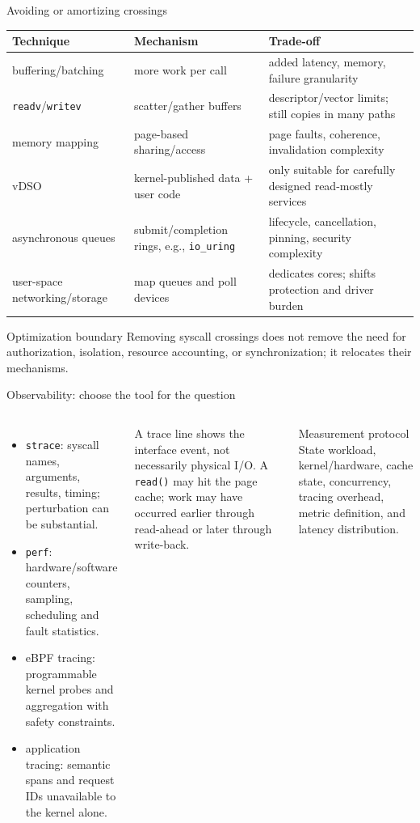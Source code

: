 \documentclass[aspectratio=169,11pt]{beamer}
\newcommand{\code}[1]{\texttt{#1}}
\begin{document}
\begin{frame}{Avoiding or amortizing crossings}
  \scriptsize
  \begin{tabularx}{\textwidth}{@{}lXX@{}}
    \toprule
    \textbf{Technique} & \textbf{Mechanism} & \textbf{Trade-off} \\
    \midrule
    buffering/batching & more work per call & added latency, memory, failure granularity \\
    \code{readv}/\code{writev} & scatter/gather buffers & descriptor/vector limits; still copies in many paths \\
    memory mapping & page-based sharing/access & page faults, coherence, invalidation complexity \\
    vDSO & kernel-published data + user code & only suitable for carefully designed read-mostly services \\
    asynchronous queues & submit/completion rings, e.g., \code{io\_uring} & lifecycle, cancellation, pinning, security complexity \\
    user-space networking/storage & map queues and poll devices & dedicates cores; shifts protection and driver burden \\
    \bottomrule
  \end{tabularx}
  \begin{alertblock}{Optimization boundary}
    Removing syscall crossings does not remove the need for authorization, isolation, resource accounting, or synchronization; it relocates their mechanisms.
  \end{alertblock}
\end{frame}

\begin{frame}{Observability: choose the tool for the question}
  \begin{columns}[T,onlytextwidth]
      \begin{itemize}
        \item \code{strace}: syscall names, arguments, results, timing; perturbation can be substantial.
        \item \code{perf}: hardware/software counters, sampling, scheduling and fault statistics.
        \item eBPF tracing: programmable kernel probes and aggregation with safety constraints.
        \item application tracing: semantic spans and request IDs unavailable to the kernel alone.
      \end{itemize}
      \begin{tcolorbox}[title=Do not infer too much]
        A trace line shows the interface event, not necessarily physical I/O. A \code{read()} may hit the page cache; work may have occurred earlier through read-ahead or later through write-back.
      \end{tcolorbox}
      \begin{block}{Measurement protocol}
        State workload, kernel/hardware, cache state, concurrency, tracing overhead, metric definition, and latency distribution.
      \end{block}
  \end{columns}
\end{frame}
\end{document}
